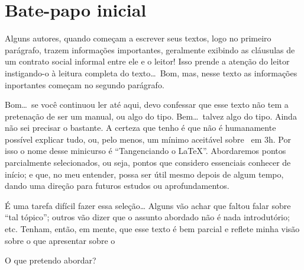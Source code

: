 
\chapter*{Bate-papo inicial} 
\label{cha:intro}

Alguns autores, quando começam a escrever seus textos, logo no primeiro parágrafo, 
trazem informações importantes, geralmente exibindo as cláusulas de um contrato
social informal entre ele e o leitor!
Isso prende a atenção do leitor instigando-o à leitura completa do texto\ldots\
Bom, mas, nesse texto as informações inportantes começam no segundo parágrafo. 
\emoji{smirking-face}

Bom\ldots\ se você continuou ler até aqui, devo confessar que esse texto não 
tem a pretenação de ser um manual, ou algo do tipo. 
Bem\ldots\ talvez algo do tipo. 
Ainda não sei precisar o bastante. 
A certeza que tenho é que não é humanamente possível explicar tudo, ou, pelo menos,
um mínimo aceitável sobre {\LaTeXX}\ em 3\unit{h}. 
Por isso o nome desse minicurso é ``{\fontins Tangenciando o \grega \LaTeX}''. 
Abordaremos pontos parcialmente selecionados, ou seja, pontos que considero 
essenciais conhecer de início; e que, no meu entender, possa ser útil mesmo 
depois de algum tempo, dando uma direção para futuros estudos ou aprofundamentos. 

É uma tarefa difícil fazer essa seleção\ldots
Alguns vão achar que faltou falar sobre ``tal tópico''; outros vão dizer que 
o assunto abordado não é nada introdutório; etc. 
Tenham, então, em mente, que esse texto é bem parcial e reflete minha visão sobre 
o que  apresentar sobre o \LaTeXX\

O que pretendo abordar?

